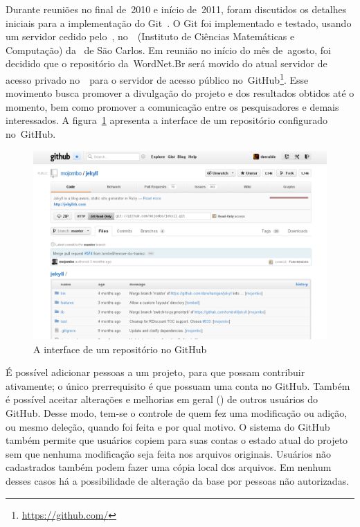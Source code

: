 Durante reuniões no final de~2010 e início de~2011, foram discutidos os
detalhes iniciais para a implementação do Git~\cite[p.~4]{beraldo11}. O Git foi
implementado e testado, usando um servidor cedido pelo~\nilc, no~\icmc\
(Instituto de Ciências Matemáticas e Computação) da \usp\ de São Carlos. Em
reunião no início do mês de~agosto, foi decidido que o repositório
da~WordNet.Br será movido do atual servidor de acesso privado no~\nilc\ para o
servidor de acesso público no~GitHub\footnote{\url{https://github.com/}}. Esse
movimento busca promover a divulgação do projeto e dos resultados obtidos até o
momento, bem como promover a comunicação entre os pesquisadores e demais
interessados. A figura~\ref{github:repositorio} apresenta a interface de um
repositório configurado no~GitHub.

\begin{figure}[h]
  \centering
  \includegraphics[width=.9\textwidth]{img/repositorio.png}
  \caption{A interface de um repositório no GitHub}
  \label{github:repositorio}
\end{figure}

É possível adicionar pessoas a um projeto, para que possam contribuir
ativamente; o único prerrequisito é que possuam uma conta no GitHub. Também é
possível aceitar alterações e melhorias em geral (\en{\textit{“pull
requests”}}) de outros usuários do GitHub. Desse modo, tem-se o controle de
quem fez uma modificação ou adição, ou mesmo deleção, quando foi feita e por
qual motivo. O sistema do GitHub também permite que usuários copiem para suas
contas o estado atual do projeto sem que nenhuma modificação seja feita nos
arquivos originais. Usuários não cadastrados também podem fazer uma cópia local
dos arquivos. Em nenhum desses casos há a possibilidade de alteração da base
por pessoas não autorizadas.

